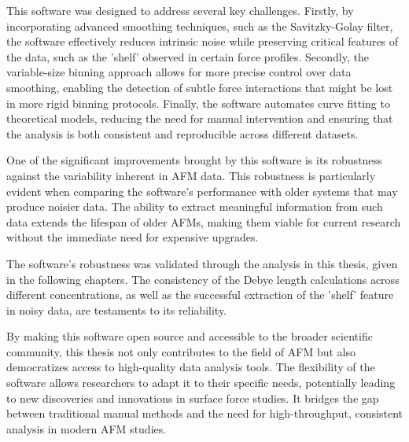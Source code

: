 This software was designed to address several key challenges. Firstly, by incorporating advanced smoothing techniques, such as the Savitzky-Golay filter, the software effectively reduces intrinsic noise while preserving critical features of the data, such as the 'shelf' observed in certain force profiles. Secondly, the variable-size binning approach allows for more precise control over data smoothing, enabling the detection of subtle force interactions that might be lost in more rigid binning protocols. Finally, the software automates curve fitting to theoretical models, reducing the need for manual intervention and ensuring that the analysis is both consistent and reproducible across different datasets.

One of the significant improvements brought by this software is its robustness against the variability inherent in AFM data. This robustness is particularly evident when comparing the software's performance with older systems that may produce noisier data. The ability to extract meaningful information from such data extends the lifespan of older AFMs, making them viable for current research without the immediate need for expensive upgrades.

The software’s robustness was validated through the analysis in this thesis, given in the following chapters. The consistency of the Debye length calculations across different concentrations, as well as the successful extraction of the 'shelf' feature in noisy data, are testaments to its reliability.

By making this software open source and accessible to the broader scientific community, this thesis not only contributes to the field of AFM but also democratizes access to high-quality data analysis tools. The flexibility of the software allows researchers to adapt it to their specific needs, potentially leading to new discoveries and innovations in surface force studies. It bridges the gap between traditional manual methods and the need for high-throughput, consistent analysis in modern AFM studies.










